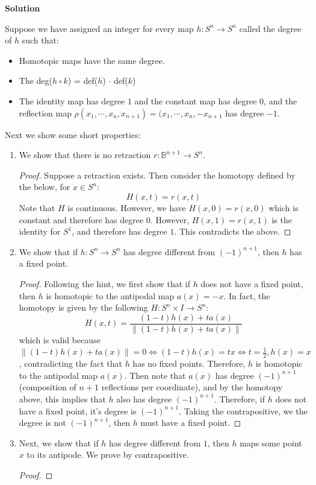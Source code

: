 \documentclass[12pt]{article}
\newcounter{AnswerCounter}
\newcounter{SubAnswerCounter}
\newenvironment{answer}[0]{
  \setcounter{SubAnswerCounter}{1}
  \bigskip
  \textbf{Solution \arabic{AnswerCounter}}
  \\
  \begin{small}
}{
  \end{small}
  \stepcounter{AnswerCounter}
}
\begin{document}
\begin{answer}[Page 366, \#10]
Suppose we have assigned an integer for every map $h: S^n \to S^n$ called the degree of $h$ such that:
\begin{itemize}
\item Homotopic maps have the same degree.
\item The deg($h \circ k$) = def($h$) $\cdot$ def($k$)
\item The identity map has degree $1$ and the constant map has degree $0$, and the reflection map $\rho(x_1, \cdots, x_n, x_{n+1}) = (x_1, \cdots, x_n, -x_{n+1}$ has degree $-1$.
\end{itemize}
Next we show some short properties:
\begin{enumerate}
\item We show that there is no retraction $r: \mathbb{B}^{n+1} \to S^n$.
\begin{proof}
Suppose a retraction exists. Then consider the homotopy defined by the below, for $x \in S^n$:
$$
H(x,t) = r(x,t)
$$
Note that $H$ is continuous. However, we have $H(x,0) = r(x,0)$ which is constant and therefore has degree $0$. However, $H(x,1) = r(x,1)$ is the identity for $S^1$, and therefore has degree $1$. This contradicts the above.
\end{proof}
\item We show that if $h: S^n \to S^n$ has degree different from $(-1)^{n+1}$, then $h$ has a fixed point.
\begin{proof}
Following the hint, we first show that if $h$ does not have a fixed point, then $h$ is homotopic to the antipodal map $a(x) = -x$. In fact, the homotopy is given by the following $H: S^n \times I \to S^n$:
$$
H(x,t) = \frac{(1-t)h(x) + ta(x)}{\|(1-t)h(x) + ta(x)\|}
$$
which is valid because $\| (1-t)h(x) + ta(x) \| = 0 \iff (1-t)h(x) = tx \iff t = \frac{1}{2}, h(x) = x$, contradicting the fact that $h$ has no fixed points. Therefore, $h$ is homotopic to the antipodal map $a(x)$. Then note that $a(x)$ has degree $(-1)^{n+1}$ (composition of $n+1$ reflections per coordinate), and by the homotopy above, this implies that $h$ also has degree $(-1)^{n+1}$. Therefore, if $h$ does not have a fixed point, it's degree is $(-1)^{n+1}$. Taking the contrapositive, we the degree is not $(-1)^{n+1}$, then $h$ must have a fixed point.
\end{proof}
\item Next, we show that if $h$ has degree different from $1$, then $h$ maps some point $x$ to its antipode. We prove by contrapositive.
\begin{proof}

\end{proof}
\end{enumerate}
\end{answer}
\end{document}
